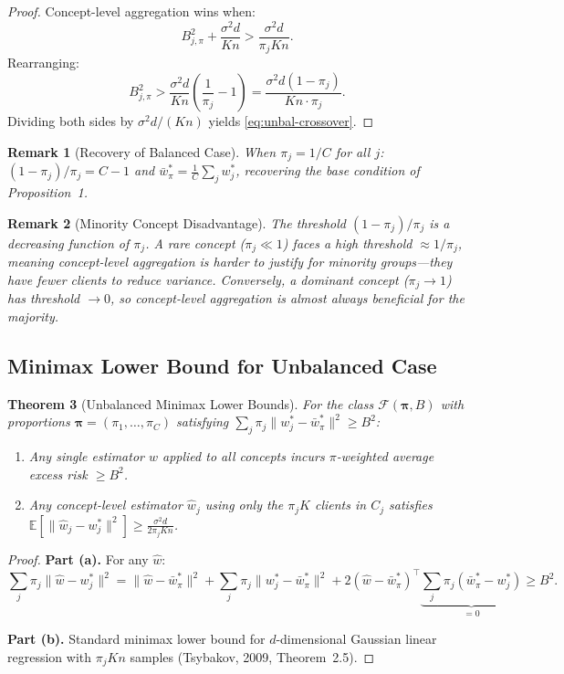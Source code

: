 \documentclass[11pt,a4paper]{article}
\newtheorem{theorem}{Theorem}
\newtheorem{remark}[theorem]{Remark}
\newcommand{\E}{\mathbb{E}}
\newcommand{\what}{\hat{w}}
\newcommand{\wbar}{\bar{w}}
\begin{document}
\begin{proof}
Concept-level aggregation wins when:
\[
B_{j,\pi}^2 + \frac{\sigma^2 d}{Kn} > \frac{\sigma^2 d}{\pi_j Kn}.
\]
Rearranging:
\[
B_{j,\pi}^2 > \frac{\sigma^2 d}{Kn}\left(\frac{1}{\pi_j} - 1\right) = \frac{\sigma^2 d(1 - \pi_j)}{Kn \cdot \pi_j}.
\]
Dividing both sides by $\sigma^2 d / (Kn)$ yields \eqref{eq:unbal-crossover}.
\end{proof}

\begin{remark}[Recovery of Balanced Case]
When $\pi_j = 1/C$ for all $j$: $(1 - \pi_j)/\pi_j = C - 1$ and $\wbar^*_\pi = \frac{1}{C}\sum_j w_j^*$, recovering the base condition of Proposition~1.
\end{remark}

\begin{remark}[Minority Concept Disadvantage]
The threshold $(1 - \pi_j)/\pi_j$ is a decreasing function of $\pi_j$. A rare concept ($\pi_j \ll 1$) faces a high threshold $\approx 1/\pi_j$, meaning concept-level aggregation is harder to justify for minority groups---they have fewer clients to reduce variance. Conversely, a dominant concept ($\pi_j \to 1$) has threshold $\to 0$, so concept-level aggregation is almost always beneficial for the majority.
\end{remark}

\subsection{Minimax Lower Bound for Unbalanced Case}

\begin{theorem}[Unbalanced Minimax Lower Bounds]\label{thm:unbal-minimax}
For the class $\mathcal{F}(\boldsymbol{\pi}, B)$ with proportions $\boldsymbol{\pi} = (\pi_1, \ldots, \pi_C)$ satisfying $\sum_j \pi_j \|w_j^* - \wbar^*_\pi\|^2 \geq B^2$:
\begin{enumerate}[label=(\alph*)]
\item Any single estimator $\what$ applied to all concepts incurs $\pi$-weighted average excess risk $\geq B^2$.
\item Any concept-level estimator $\what_j$ using only the $\pi_j K$ clients in $C_j$ satisfies $\E[\|\what_j - w_j^*\|^2] \geq \frac{\sigma^2 d}{2\pi_j K n}$.
\end{enumerate}
\end{theorem}

\begin{proof}
\textbf{Part (a).} For any $\what$:
\[
\sum_j \pi_j \|\what - w_j^*\|^2
= \|\what - \wbar^*_\pi\|^2 + \sum_j \pi_j \|w_j^* - \wbar^*_\pi\|^2
+ 2(\what - \wbar^*_\pi)^\top \underbrace{\sum_j \pi_j (\wbar^*_\pi - w_j^*)}_{= 0} \geq B^2.
\]

\textbf{Part (b).} Standard minimax lower bound for $d$-dimensional Gaussian linear regression with $\pi_j K n$ samples (Tsybakov, 2009, Theorem~2.5).
\end{proof}
\end{document}

